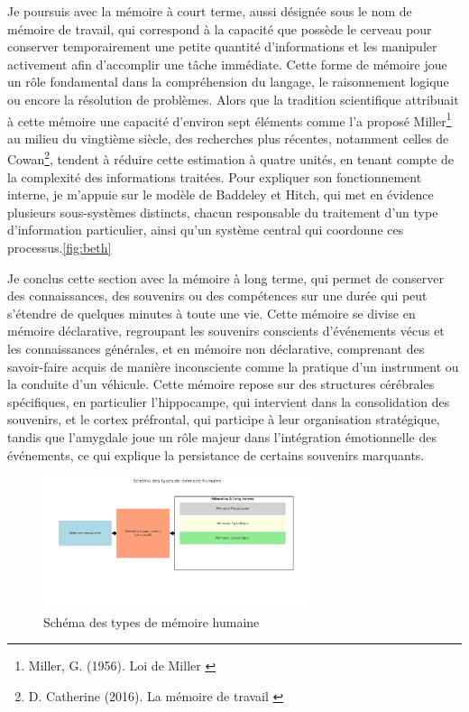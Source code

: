 \documentclass[11pt,a4paper]{report}
\begin{document}
Je poursuis avec la mémoire à court terme, aussi désignée sous le nom de mémoire de travail, qui correspond à la capacité que possède le cerveau pour conserver temporairement une petite quantité d’informations et les manipuler activement afin d’accomplir une tâche immédiate. Cette forme de mémoire joue un rôle fondamental dans la compréhension du langage, le raisonnement logique ou encore la résolution de problèmes. Alors que la tradition scientifique attribuait à cette mémoire une capacité d’environ sept éléments comme l’a proposé Miller\footnote{Miller, G. (1956). Loi de Miller \cite{miller}} au milieu du vingtième siècle, des recherches plus récentes, notamment celles de Cowan\footnote{D. Catherine (2016). La mémoire de travail \cite{demoulin}}, tendent à réduire cette estimation à quatre unités, en tenant compte de la complexité des informations traitées. Pour expliquer son fonctionnement interne, je m’appuie sur le modèle de Baddeley et Hitch, qui met en évidence plusieurs sous-systèmes distincts, chacun responsable du traitement d’un type d’information particulier, ainsi qu’un système central qui coordonne ces processus.\ref{fig:beth}

Je conclus cette section avec la mémoire à long terme, qui permet de conserver des connaissances, des souvenirs ou des compétences sur une durée qui peut s’étendre de quelques minutes à toute une vie. Cette mémoire se divise en mémoire déclarative, regroupant les souvenirs conscients d’événements vécus et les connaissances générales, et en mémoire non déclarative, comprenant des savoir-faire acquis de manière inconsciente comme la pratique d’un instrument ou la conduite d’un véhicule. Cette mémoire repose sur des structures cérébrales spécifiques, en particulier l’hippocampe, qui intervient dans la consolidation des souvenirs, et le cortex préfrontal, qui participe à leur organisation stratégique, tandis que l’amygdale joue un rôle majeur dans l’intégration émotionnelle des événements, ce qui explique la persistance de certains souvenirs marquants.

\begin{figure}[h]
    \centering
    \includegraphics[width=0.7\textwidth]{images/1.1.1.png}
    \caption{Schéma des types de mémoire humaine}
    \label{fig:1.1.1}
\end{figure}
\end{document}
